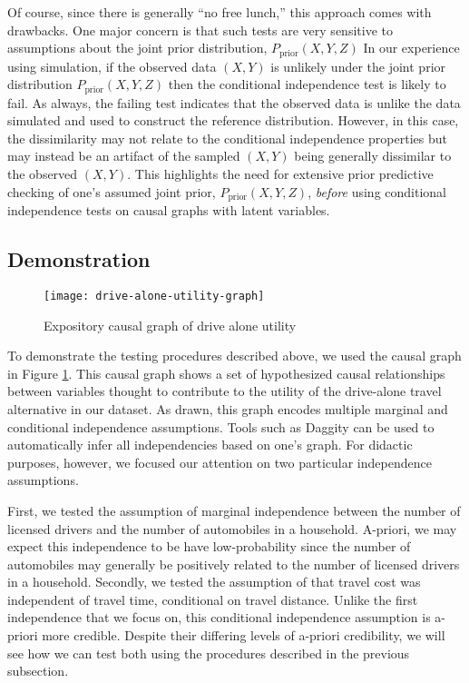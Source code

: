 Of course, since there is generally ``no free lunch,'' this approach comes with drawbacks.
One major concern is that such tests are very sensitive to assumptions about the joint prior distribution, $P_{\textrm{prior}} \left( X, Y, Z \right)$
In our experience using simulation, if the observed data $\left( X, Y \right)$ is unlikely under the joint prior distribution $P_{\textrm{prior}} \left( X, Y, Z \right)$ then the conditional independence test is likely to fail.
As always, the failing test indicates that the observed data is unlike the data simulated and used to construct the reference distribution.
However, in this case, the dissimilarity may not relate to the conditional independence properties but may instead be an artifact of the sampled $\left( X, Y \right)$ being generally dissimilar to the observed $\left( X, Y \right)$.
This highlights the need for extensive prior predictive checking of one's assumed joint prior, $P_{\textrm{prior}} \left( X, Y, Z \right)$, \textit{before} using conditional independence tests on causal graphs with latent variables.

\subsection{Demonstration}
\label{sec:testing-demonstration}

\begin{figure}
   \centering
   \texttt{[image: drive-alone-utility-graph]}
   \caption{Expository causal graph of drive alone utility}
   \label{fig:graph-for-testing}
\end{figure}
To demonstrate the testing procedures described above, we used the causal graph in Figure \ref{fig:graph-for-testing}.
This causal graph shows a set of hypothesized causal relationships between variables thought to contribute to the utility of the drive-alone travel alternative in our dataset.
As drawn, this graph encodes multiple marginal and conditional independence assumptions.
Tools such as Daggity \citep{textor_2016_robust} can be used to automatically infer all independencies based on one's graph.
For didactic purposes, however, we focused our attention on two particular independence assumptions.

First, we tested the assumption of marginal independence between the number of licensed drivers and the number of automobiles in a household.
A-priori, we may expect this independence to be have low-probability since the number of automobiles may generally be positively related to the number of licensed drivers in a household.
Secondly, we tested the assumption of that travel cost was independent of travel time, conditional on travel distance.
Unlike the first independence that we focus on, this conditional independence assumption is a-priori more credible.
Despite their differing levels of a-priori credibility, we will see how we can test both using the procedures described in the previous subsection.

